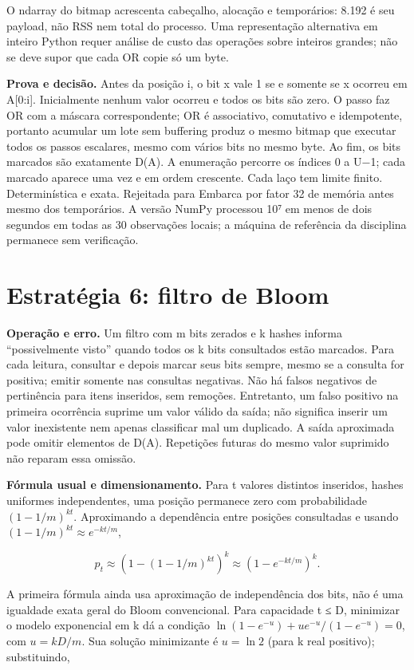 \documentclass[
  brazilian,
  11pt,
  a4paper,
]{article}
\let\oldsection\section
\renewcommand{\section}{\Needspace{6\baselineskip}\oldsection}
\begin{document}
O ndarray do bitmap acrescenta cabeçalho, alocação e temporários: 8.192
é seu payload, não RSS nem total do processo. Uma representação
alternativa em inteiro Python requer análise de custo das operações
sobre inteiros grandes; não se deve supor que cada OR copie só um byte.

\textbf{Prova e decisão.} Antes da posição i, o bit x vale 1 se e
somente se x ocorreu em A{[}0:i{]}. Inicialmente nenhum valor ocorreu e
todos os bits são zero. O passo faz OR com a máscara correspondente; OR
é associativo, comutativo e idempotente, portanto acumular um lote sem
buffering produz o mesmo bitmap que executar todos os passos escalares,
mesmo com vários bits no mesmo byte. Ao fim, os bits marcados são
exatamente D(A). A enumeração percorre os índices 0 a U−1; cada marcado
aparece uma vez e em ordem crescente. Cada laço tem limite finito.
Determinística e exata. Rejeitada para Embarca por fator 32 de memória
antes mesmo dos temporários. A versão NumPy processou 10⁷ em menos de
dois segundos em todas as 30 observações locais; a máquina de referência
da disciplina permanece sem verificação.

\section{Estratégia 6: filtro de
Bloom}\label{estratuxe9gia-6-filtro-de-bloom}

\textbf{Operação e erro.} Um filtro com m bits zerados e k hashes
informa ``possivelmente visto'' quando todos os k bits consultados estão
marcados. Para cada leitura, consultar e depois marcar seus bits sempre,
mesmo se a consulta for positiva; emitir somente nas consultas
negativas. Não há falsos negativos de pertinência para itens inseridos,
sem remoções. Entretanto, um falso positivo na primeira ocorrência
suprime um valor válido da saída; não significa inserir um valor
inexistente nem apenas classificar mal um duplicado. A saída aproximada
pode omitir elementos de D(A). Repetições futuras do mesmo valor
suprimido não reparam essa omissão.

\textbf{Fórmula usual e dimensionamento.} Para t valores distintos
inseridos, hashes uniformes independentes, uma posição permanece zero
com probabilidade \((1-1/m)^{kt}\). Aproximando a dependência entre
posições consultadas e usando \((1-1/m)^{kt}\approx e^{-kt/m}\),

\[p_t\approx\left(1-(1-1/m)^{kt}\right)^k
\approx(1-e^{-kt/m})^k.\]

A primeira fórmula ainda usa aproximação de independência dos bits, não
é uma igualdade exata geral do Bloom convencional. Para capacidade t ≤
D, minimizar o modelo exponencial em k dá a condição
\(\ln(1-e^{-u})+u e^{-u}/(1-e^{-u})=0\), com \(u=kD/m\). Sua solução
minimizante é \(u=\ln2\) (para k real positivo); substituindo,
\end{document}
